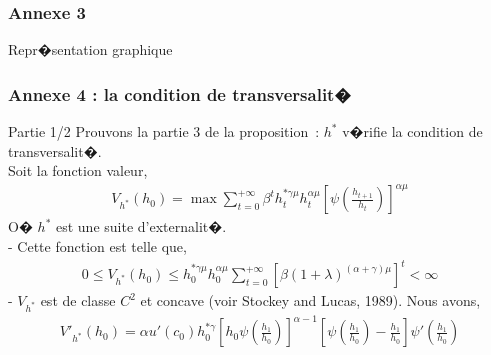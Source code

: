 \documentclass[10pt, hyperref={pdfpagemode=FullScreen}]{beamer} %
\begin{document}
\begin{frame}\label{annexe3part3}
\frametitle{Annexe 3}
\begin{block}{Repr�sentation graphique}
\begin{center}
\begin{figure}[ht]
\begin{center}
\setlength{\fboxsep}{8pt}
\end{center}
\end{figure}
\hyperlink{proposition3}{}
\end{center}
\end{block}
\end{frame}


\begin{frame}\label{annexe4part1}
\frametitle{Annexe 4 : la condition de transversalit�}
\begin{block}{Partie 1/2}
\scriptsize{
Prouvons la partie 3 de la proposition~: $h^{*}$ v�rifie la condition de transversalit�. \\
Soit la fonction valeur, 
\begin{eqnarray*}
V_{h^{*}}(h_{0}) = \max \sum_{t=0}^{+\infty}\beta^{t}h_{t}^{*\gamma\mu}h_{t}^{\alpha\mu}[\psi(\frac{h_{t+1}}{h_{t}})]^{\alpha\mu}
\end{eqnarray*}
O� $h^{*}$ est une suite d'externalit�.\\
- Cette fonction est telle que,
\begin{eqnarray*}
0\leq V_{h^{*}}(h_{0}) \leq h_{0}^{*\gamma\mu}h_{0}^{\alpha\mu}\sum_{t=0}^{+\infty}[\beta(1+\lambda)^{(\alpha+\gamma)\mu}]^{t}<\infty
\end{eqnarray*}
- $V_{h^{*}}$ est de classe $C^{2}$ et concave (voir Stockey and Lucas, 1989). Nous avons, 
\begin{eqnarray*}
V'_{h^{*}}(h_{0}) = \alpha u'(c_{0})h_{0}^{*\gamma}[h_{0}\psi(\frac{h_{1}}{h_{0}})]^{\alpha-1}[\psi(\frac{h_{1}}{h_{0}})-\frac{h_{1}}{h_{0}}]\psi'(\frac{h_{1}}{h_{0}})
\end{eqnarray*}
}
\end{block}
\end{frame}
\end{document}
